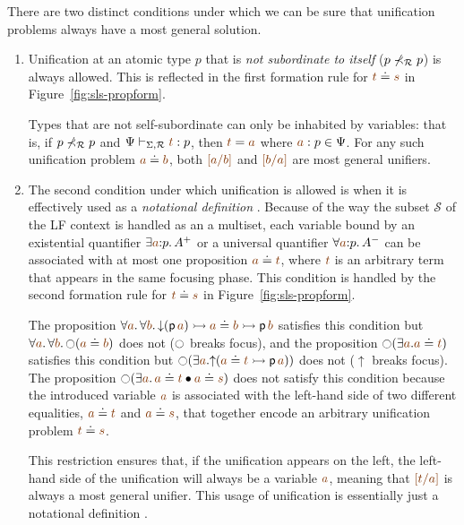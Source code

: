 There are two distinct conditions under which we can be sure that
unification problems always have a most general solution.  \smallskip
\begin{enumerate}
\item Unification at an atomic type $p$ that is {\it not subordinate
    to itself} ($p \not\prec_\mathcal R p$) is always allowed.  This is
  reflected in the first formation rule for $\lf{t} \doteq
  \lf{s}$ in Figure~\ref{fig:sls-propform}. 

  Types that are not self-subordinate can only be inhabited by
  variables: that is, if $p \not\prec_\mathcal R p$ and $\Psi
  \vdash_{\Sigma,\subord} \lf{t} : p$, then $\lf{t} = \lf{{a}}$ where
  $\lf{a}:p \in \Psi$. For any such unification problem $\lf{{a}}
  \doteq \lf{{b}}$, both $\lf{[{a}/b]}$ and $\lf{[{b}/a]}$ are most
  general unifiers.

\item The second condition under which unification is allowed is when
  it is effectively used as a {\it notational definition}
  \cite{pfenning99algorithms}. Because of the way the subset $\mathcal
  S$ of the LF context is handled as an a multiset, each variable
  bound by an existential quantifier $\exists \lf{a}{:}p.\,A^+$ or a
  universal quantifier $\forall \lf{a}{:}p.\,A^-$ can be associated
  with at most one proposition $\lf{a} \doteq \lf{t}$, where $\lf{t}$
  is an arbitrary term that appears in the same focusing phase. This
  condition is handled by the second formation rule for $\lf{t} \doteq
  \lf{s}$ in Figure~\ref{fig:sls-propform}.

  The proposition $\forall \lf{a}.\, \forall \lf{b}.\,
  {\downarrow}({\sf p}\,\lf{a}) \lefti \lf{a} \doteq \lf{b} \lefti
  {\sf p}\,\lf{b}$ satisfies this condition but $\forall
  \lf{a}.\,\forall \lf{b}.\,{\ocircle}(\lf{a} \doteq \lf{b})$ does not
  ($\ocircle$ breaks focus), and the proposition ${\ocircle}(\exists
  \lf{a}. \lf{a} \doteq \lf{t})$ satisfies this condition but
  ${\ocircle}(\exists \lf{a}.  {\uparrow}(\lf{a} \doteq \lf{t} \lefti
  {\sf p}\,\lf{a}))$ does not (${\uparrow}$ breaks focus).  The
  proposition ${\ocircle}(\exists \lf{a}.\, \lf{a} \doteq \lf{t} \fuse
  \lf{a} \doteq \lf{s})$ does not satisfy this condition because the
  introduced variable $\lf{a}$ is associated with the left-hand side
  of two different equalities, $\lf{a} \doteq \lf{t}$ and
  $\lf{a} \doteq \lf{s}$, that together encode an arbitrary unification
  problem $\lf{t} \doteq \lf{s}$. 

  This restriction ensures that, if the unification appears on the
  left, the left-hand side of the unification will always be a
  variable $\lf{a}$, meaning that $\lf{[t/a]}$ is always a most
  general unifier.  This usage of unification is essentially just a
  notational definition \cite{pfenning99algorithms}.
\end{enumerate}
\smallskip

